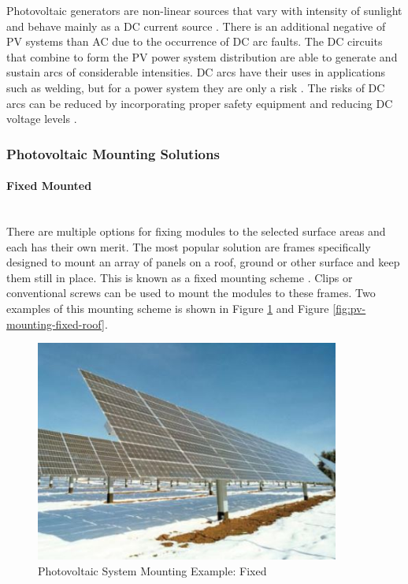 Photovoltaic generators are non-linear sources that vary with intensity of sunlight and behave mainly as a DC current source \cite{Ribeiro2009}. There is an additional negative of PV systems than AC due to the occurrence of DC arc faults. The DC circuits that combine to form the PV power system distribution are able to generate and sustain arcs of considerable intensities. DC arcs have their uses in applications such as welding, but for a power system they are only a risk \cite{Ribeiro2009}. The risks of DC arcs can be reduced by incorporating proper safety equipment and reducing DC voltage levels \cite{Ribeiro2009}. 

\subsubsection{Photovoltaic Mounting Solutions} \label{section:photovoltatic-mounting}

\paragraph{Fixed Mounted} 
~\\
There are multiple options for fixing modules to the selected surface areas and each has their own merit. The most popular solution are frames specifically designed to mount an array of panels on a roof, ground or other surface and keep them still in place. This is known as a fixed mounting scheme \cite{Haberlin2012}. Clips or conventional screws can be used to mount the modules to these frames. Two examples of this mounting scheme is shown in Figure \ref{fig:pv-mounting-fixed-field} and Figure \ref{fig:pv-mounting-fixed-roof}. 

\begin{figure}[H]
	\hfill\includegraphics[width = 100mm]{images/pv-fixed-mounting}\hspace*{\fill}
	\caption{Photovoltaic System Mounting Example: Fixed  \cite{Haberlin2012}} 
	\label{fig:pv-mounting-fixed-field}
\end{figure}

